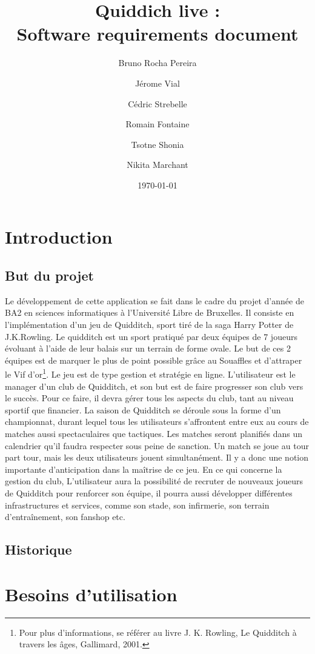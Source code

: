 \documentclass[a4paper]{article}
\title{Quiddich live : \\Software requirements document}
\author{Bruno Rocha Pereira \and Jérome Vial \and Cédric Strebelle \and
Romain Fontaine \and Tsotne Shonia \and Nikita Marchant}
\date{\today}
\begin{document}
\maketitle

\section{Introduction}
\subsection{But du projet}
Le développement de cette application se fait dans le cadre du projet d'année de BA2 en sciences informatiques à l'Université Libre de Bruxelles. Il consiste en l'implémentation d'un jeu de Quidditch, sport tiré de la saga Harry Potter de J.K.Rowling. 
Le quidditch est un sport pratiqué par deux équipes de 7 joueurs évoluant à l'aide de leur balais sur un terrain de forme ovale. Le but de ces 2 équipes est de marquer le plus de point possible grâce au Souaffles et d'attraper le Vif d'or\footnote{Pour plus d'informations, se référer au livre J. K. Rowling, Le Quidditch à travers les âges, Gallimard, 2001.}. 
Le jeu est de type gestion et stratégie en ligne. L'\gls{utilisateur} est le manager d'un club de Quidditch, et son but est de faire progresser son club vers le succès. Pour ce faire, il devra gérer tous les aspects du club, tant au niveau sportif que financier. La saison de Quidditch se déroule sous la forme d'un championnat, durant lequel tous les \glspl{utilisateur} s'affrontent entre eux au cours de matches aussi spectaculaires que tactiques. Les matches seront planifiés dans un calendrier qu'il faudra respecter sous peine de sanction. Un match se joue au tour part tour, mais les deux \glspl{utilisateur} jouent simultanément. Il y a donc une notion importante d'anticipation dans la maîtrise de ce jeu. En ce qui concerne la gestion du club, L'\gls{utilisateur} aura la possibilité de recruter de nouveaux joueurs de Quidditch pour renforcer son équipe, il pourra aussi développer différentes infrastructures et services, comme son stade, son infirmerie, son terrain d'entraînement, son fanshop etc.

\printglossary[numberedsection]
\subsection{Historique}

\section{Besoins d'utilisation}
\end{document}
